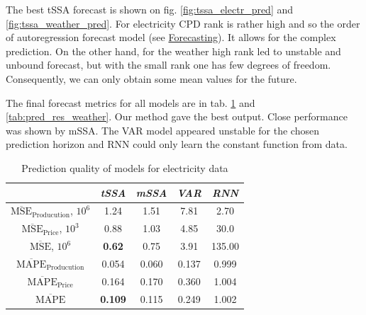 	The best tSSA forecast is shown on fig. \ref{fig:tssa_electr_pred} and \ref{fig:tssa_weather_pred}. For electricity CPD rank is rather high and so the order of autoregression forecast model (see \hyperref[sec:tssa_forecast]{Forecasting}). It allows for the complex prediction. On the other hand, for the weather high rank led to unstable and unbound forecast, but with the small rank one has few degrees of freedom. Consequently, we can only obtain some mean values for the future.
	
	The final forecast metrics for all models are in tab. \ref{tab:pred_res_electr} and \ref{tab:pred_res_weather}. Our method gave the best output. Close performance was shown by mSSA. The VAR model appeared unstable for the chosen prediction horizon and RNN could only learn the constant function from data.
	
	\def\arraystretch{1.1}
	\begin{table}[h]
		\centering
		\caption{Prediction quality of models for electricity data}\label{tab:pred_res_electr}
		\begin{tabular}{|c|c|c|c|c|}
			\hline
			& \textit{tSSA}  & \textit{mSSA} & \textit{VAR} & \textit{RNN} \\ \hline
			$ \overline{\text{MSE}}_{\text{Producution}} $, $10^6$ & 1.24           & 1.51          & 7.81         & 2.70         \\ \hline
			$ \overline{\text{MSE}}_{\text{Price}} $, $10^3$      & 0.88           & 1.03          & 4.85         & 30.0         \\ \hline
			$ \overline{\text{MSE}} $, $10^6$             & \textbf{0.62}  & 0.75          & 3.91         & 135.00       \\ \hline
			$ \overline{\text{MAPE}}_{\text{Producution}} $        & 0.054          & 0.060         & 0.137        & 0.999        \\ \hline
			$ \overline{\text{MAPE}}_{\text{Price}} $             & 0.164          & 0.170         & 0.360        & 1.004        \\ \hline
			$ \overline{\text{MAPE}} $                    & \textbf{0.109} & 0.115         & 0.249        & 1.002        \\ \hline
		\end{tabular}
	\end{table}
	
